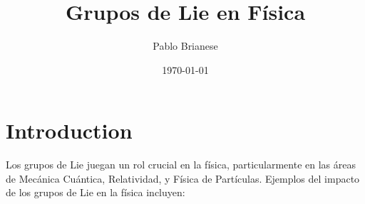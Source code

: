 \documentclass{article}
\begin{document}
\title{Grupos de Lie en Física}
\author{Pablo Brianese}
\date{\today}

\maketitle

\begin{abstract}
\end{abstract}

\section{Introduction}

Los grupos de Lie juegan un rol crucial en la física, particularmente en las áreas de Mecánica Cuántica, Relatividad, y Física de Partículas. Ejemplos del impacto de los grupos de Lie en la física incluyen:
\end{document}
